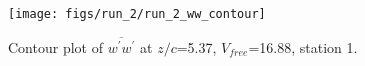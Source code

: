 \begin{figure}[H]
\centering
\texttt{[image: figs/run\_2/run\_2\_ww\_contour]}
\caption{Contour plot of $\overline{w^\prime w^\prime}$ at $z/c$=5.37, $V_{free}$=16.88, station 1.}
\label{fig:run_2_ww_contour}
\end{figure}


